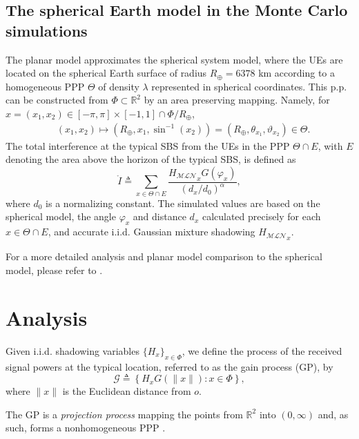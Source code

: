 \documentclass[lettersize,journal]{IEEEtran}
\newcommand{\rEarth}{R_{\oplus}}
\newcommand{\R}{\mathbb{R}}
\begin{document}
\subsection{The spherical Earth model in the Monte Carlo simulations }

\label{sec:sphericalmodel}
The planar model approximates the spherical system model, where the UEs are located on the spherical Earth surface of radius $\rEarth= 6378$ km according to a homogeneous PPP $\Theta$ of density $\lambda$ represented in spherical coordinates. This p.p. can be constructed from $\Phi \subset \R^2$ by an area preserving mapping. Namely, for $x=(x_1,x_2) \in [-\pi,\pi]\times[-1,1]\cap\Phi/\rEarth$,
\begin{align}
  &(x_1,x_2)\mapsto (\rEarth,x_1,\sin^{-1}(x_2))=(\rEarth,\theta_{x_1},\vartheta_{x_2}) \in \Theta.
\end{align}
The total interference at the typical SBS from the UEs in the PPP $\Theta \cap E $, with $E$ denoting the area above the horizon of the typical SBS, is defined as
\begin{equation}
  \label{eq:mathringptot}
  \mathring{I} \triangleq  \sum_{x \in \Theta \cap E }  \frac{{H_{\mathcal{M}\mathcal{L}\mathcal{N}}}_x G(\varphi_x)}{(d_x/d_0)^{\alpha}},
\end{equation}
where $d_0$ is a normalizing constant. {The simulated values are based on the spherical model}, the angle $\varphi_x$ and distance $d_x$ calculated precisely for each $x \in \Theta \cap E$, and accurate i.i.d. Gaussian mixture shadowing ${H_{\mathcal{M}\mathcal{L}\mathcal{N}}}_x$.

For a more detailed analysis and planar model comparison to the spherical model, please refer to \cite{10909705}.
\section{Analysis}

         
Given i.i.d. shadowing variables $\{H_x\}_{x \in \Phi}$, we define the process of the received signal powers at the typical location, referred to as the gain process (GP), by
\begin{equation}
  \label{eq:gainprocess}
  \mathcal{G} \triangleq \left\{ H_x G(\|x\|) : x \in \Phi \right\},
\end{equation}
where $\|x\|$ is the Euclidean distance from $\textit{o}$. 

The GP is a \textit{projection process} mapping the points from $\mathbb{R}^2$ into $(0,\infty)$ and, as such, forms a nonhomogeneous PPP \cite[Section 4.2.5]{alma998193414406526}.
\end{document}
